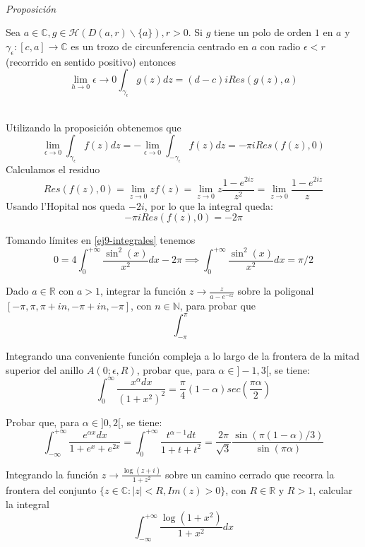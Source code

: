 \begin{sol}
\


	\textit{Proposición}

	Sea $a\in\mathbb{C}, g\in\mathcal{H}(D(a,r)\backslash\{a\}), r>0$. Si $g$ tiene un polo de orden $1$ en $a$ y $\gamma_{\epsilon} : [c,a] \rightarrow\mathbb{C}$ es un trozo de circunferencia centrado en $a$ con radio $\epsilon<r$ (recorrido en sentido positivo) entonces
	$$ \lim_{h\rightarrow 0}\epsilon\rightarrow 0 \int_{\gamma_{\epsilon}} g(z)dz = (d-c)iRes(g(z),a) $$
\

Utilizando la proposición obtenemos que
$$ \lim_{\epsilon\rightarrow 0} \int_{\gamma_{\epsilon}} f(z)dz = -\lim_{\epsilon\rightarrow 0} \int_{-\gamma_{\epsilon}} f(z)dz = -\pi iRes(f(z),0) $$
Calculamos el residuo
$$ Res(f(z),0) = \lim_{z\rightarrow 0} zf(z) = \lim_{z\rightarrow 0} z \frac{1-e^{2iz}}{z^2} =  \lim_{z\rightarrow 0} \frac{1-e^{2iz}}{z} $$
Usando l'Hopital nos queda $-2i$, por lo que la integral queda:
$$ -\pi iRes(f(z),0) = -2\pi $$

Tomando límites en \ref{ej9-integrales} tenemos
$$ 0=4\int_{0}^{+\infty} \frac{\sin^2(x)}{x^2} dx -2\pi  \implies  \int_{0}^{+\infty} \frac{\sin^2(x)}{x^2}dx = \pi/2 $$
\end{sol}


\begin{ejer}
	Dado $a\in\mathbb{R}$ con $a>1$, integrar la función $z\rightarrow \frac{z}{a-e^{-iz}}$ sobre la poligonal $[-\pi,\pi,\pi+in,-\pi+in,-\pi]$, con $n\in\mathbb{N}$, para probar que
	$$ \int_{-\pi}^{\pi} $$
\end{ejer}


\begin{ejer}
	Integrando una conveniente función compleja a lo largo de la frontera de la mitad superior del anillo $A(0;\epsilon,R)$, probar que, para $\alpha\in]-1,3[$, se tiene:
	$$ \int_{0}^{\infty} \frac{x^{\alpha}dx}{(1+x^2)^2} = \frac{\pi}{4}(1-\alpha)sec(\frac{\pi\alpha}{2}) $$
\end{ejer}


\begin{ejer}
	Probar que, para $\alpha\in ]0,2[$, se tiene:
	$$ \int_{-\infty}^{+\infty} \frac{e^{\alpha x}dx}{1+e^x+e^{2x}} = \int_{0}^{+\infty} \frac{t^{\alpha-1} dt}{1+t+t^2} = \frac{2\pi}{\sqrt{3}}\frac{\sin(\pi(1-\alpha)/3)}{\sin(\pi\alpha)} $$
\end{ejer}


\begin{ejer}
	Integrando la función $z\rightarrow\frac{\log(z+i)}{1+z^2}$ sobre un camino cerrado que recorra la frontera del conjunto $\{ z\in\mathbb{C} : |z|<R, Im(z)>0 \}$, con $R\in\mathbb{R}$ y $R>1$, calcular la integral
	$$ \int_{-\infty}^{+\infty} \frac{\log(1+x^2)}{1+x^2}dx $$
\end{ejer}



